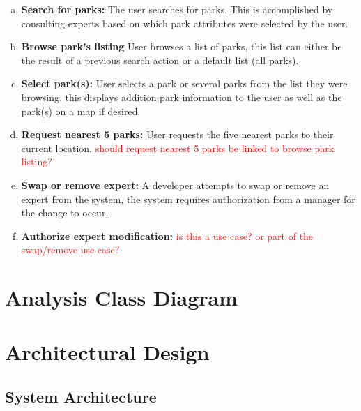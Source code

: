 \documentclass[titlepage,12pt]{article}
\begin{document}
\begin{enumerate}[a)]
    \item \textbf{Search for parks:} The user searches for parks. This is accomplished by consulting
    experts based on which park attributes were selected by the user.
    \item \textbf{Browse park's listing} User browses a list of parks, this list can either be the
    result of a previous search action or a default list (all parks).
    \item \textbf{Select park(s):} User selects a park or several parks from the list they were
    browsing, this displays addition park information to the user as well as the park(s) on a map if
    desired.
    \item \textbf{Request nearest 5 parks:} User requests the five nearest parks to their current
    location. \textcolor{red}{should request nearest 5 parks be linked to browse park listing?}
    \item \textbf{Swap or remove expert:} A developer attempts to swap or remove an expert from the
    system, the system requires authorization from a manager for the change to occur.
    \item \textbf{Authorize expert modification:} \textcolor{red}{is this a use case? or part of the
    swap/remove use case?}
\end{enumerate}


\section{Analysis Class Diagram}
\label{sec:analysis_class_diagram}



\section{Architectural Design}
\label{sec:architectural_design}


\subsection{System Architecture}
\label{sub:system_architecture}
\end{document}
